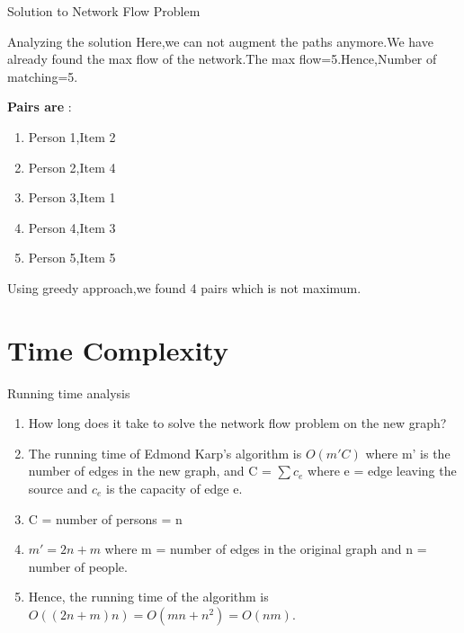 \documentclass{beamer}
\begin{document}
\begin{frame}{Solution to Network Flow Problem}
\begin{tikzpicture}
            
            

        \end{tikzpicture}

    
    
\end{frame}
\begin{frame}{Analyzing the solution}
            Here,we can not augment the paths anymore.We have already found the max flow of the network.The max flow=5.Hence,Number of matching=5.
        
        \textbf{Pairs are} : 
        \begin{enumerate}
            \item Person 1,Item 2
            \pause
            \item Person 2,Item 4
            \pause
            \item Person 3,Item 1
            \pause
            \item Person 4,Item 3
            \pause
            \item Person 5,Item 5
        \end{enumerate}
        \pause
        Using greedy approach,we found 4 pairs which is not maximum.
\end{frame}

\section{Time Complexity}
\begin{frame}{Running time analysis}
\begin{enumerate}
  \item<1-> How long does it take to solve the network flow problem on the new graph?
  \pause
  \item<2-> The running time of Edmond Karp's algorithm is $ O(m'C) $ where m' is
  the number of edges in the new graph, and C = $\sum c_{e}$ where e = edge leaving the source and $c_{e}$ is the capacity of edge e.
  \pause
  \item<3-> C =  number of persons  = n

  \pause
  \item<4-> $m' = 2n + m$ where m = number of edges in the original graph and n = number of people.
  \pause
  \item <5-> Hence, the running time of the algorithm is $ O((2n + m)n) = O(mn + n^{2}) = O(nm) $.
\end{enumerate}

\end{frame}
\end{document}
